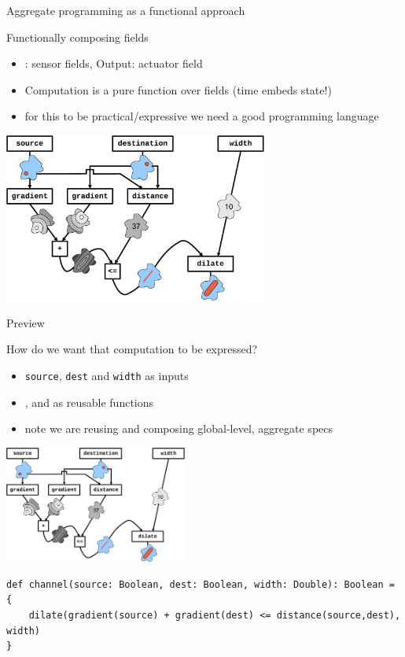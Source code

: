 \documentclass[presentation, 8pt]{beamer}\mode<presentation>{\usetheme{AMSBolognaFC}}
\begin{document}
\begin{frame}{Aggregate programming as a functional approach}
\begin{exampleblock}{Functionally composing fields}
\begin{itemize}
	\item {}: sensor fields, Output: actuator field
	\item Computation is a pure function over fields (time embeds state!)
	\item[\faArrowRight] for this to be practical/expressive we need a good programming language
\end{itemize}
\end{exampleblock}
\centering
\includegraphics[width=0.65\textwidth]{img/functions.pdf}
\end{frame}
\begin{frame}[fragile]{Preview}
	\begin{exampleblock}{How do we want that computation to be expressed?}
		\begin{itemize}
			\item \texttt{source}, \texttt{dest} and \texttt{width} as inputs
			\item {},  and  as reusable functions
			\item[\faArrowRight] note we are reusing and composing global-level, aggregate specs 
		\end{itemize}
	\end{exampleblock}
\centering
\includegraphics[width=0.45\textwidth]{img/functions.pdf}
\begin{verbatim}
def channel(source: Boolean, dest: Boolean, width: Double): Boolean = {
	dilate(gradient(source) + gradient(dest) <= distance(source,dest), width)
}
\end{verbatim}
\end{frame}
\end{document}
